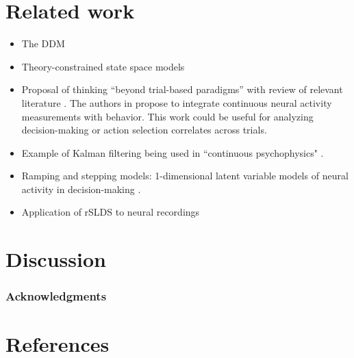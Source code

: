 \documentclass{article}
\begin{document}
\section{Related work}
\begin{itemize}
\item The DDM \cite{ratcliff2008diffusion,gold2007neural}
\item Theory-constrained state space models \cite{linderman2017using}
\item Proposal of thinking ``beyond trial-based paradigms'' with review of relevant literature \cite{huk2018beyond}. The authors in  \cite{huk2018beyond} propose to integrate continuous neural activity measurements with behavior. This work could be useful for analyzing decision-making or action selection correlates across trials.
\item Example of Kalman filtering being used in ``continuous psychophysics" \cite{bonnen2015continuous}.
\item Ramping and stepping models: 1-dimensional latent variable models of neural activity in decision-making \cite{latimer2015single,zoltowski2019discrete}. 
\item Application of rSLDS to neural recordings \cite{linderman2019hierarchical}
\end{itemize}

\section{Discussion}


\subsubsection*{Acknowledgments}


\section*{References}

\medskip

\small

%

\end{document}
